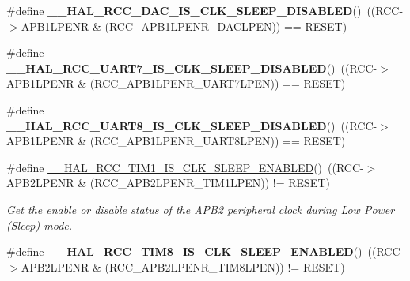 \begin{DoxyCompactItemize}
\item 
\mbox{\label{group___r_c_c___clock___sleep___enable___disable___status_ga12790e0adb572f2cd2c1b643906aa377}} 
\#define {\bfseries \+\_\+\+\_\+\+H\+A\+L\+\_\+\+R\+C\+C\+\_\+\+D\+A\+C\+\_\+\+I\+S\+\_\+\+C\+L\+K\+\_\+\+S\+L\+E\+E\+P\+\_\+\+D\+I\+S\+A\+B\+L\+ED}()~((R\+CC-\/$>$A\+P\+B1\+L\+P\+E\+NR \& (R\+C\+C\+\_\+\+A\+P\+B1\+L\+P\+E\+N\+R\+\_\+\+D\+A\+C\+L\+P\+EN)) == R\+E\+S\+ET)
\item 
\mbox{\label{group___r_c_c___clock___sleep___enable___disable___status_ga0b97aa0da40ed7519b3ddeb8267cccd8}} 
\#define {\bfseries \+\_\+\+\_\+\+H\+A\+L\+\_\+\+R\+C\+C\+\_\+\+U\+A\+R\+T7\+\_\+\+I\+S\+\_\+\+C\+L\+K\+\_\+\+S\+L\+E\+E\+P\+\_\+\+D\+I\+S\+A\+B\+L\+ED}()~((R\+CC-\/$>$A\+P\+B1\+L\+P\+E\+NR \& (R\+C\+C\+\_\+\+A\+P\+B1\+L\+P\+E\+N\+R\+\_\+\+U\+A\+R\+T7\+L\+P\+EN)) == R\+E\+S\+ET)
\item 
\mbox{\label{group___r_c_c___clock___sleep___enable___disable___status_gaf2de27f622cf9f740a925dcf1b533bdd}} 
\#define {\bfseries \+\_\+\+\_\+\+H\+A\+L\+\_\+\+R\+C\+C\+\_\+\+U\+A\+R\+T8\+\_\+\+I\+S\+\_\+\+C\+L\+K\+\_\+\+S\+L\+E\+E\+P\+\_\+\+D\+I\+S\+A\+B\+L\+ED}()~((R\+CC-\/$>$A\+P\+B1\+L\+P\+E\+NR \& (R\+C\+C\+\_\+\+A\+P\+B1\+L\+P\+E\+N\+R\+\_\+\+U\+A\+R\+T8\+L\+P\+EN)) == R\+E\+S\+ET)
\item 
\#define \mbox{\hyperlink{group___r_c_c___clock___sleep___enable___disable___status_ga0b265851c7557da6b372ff462819caa9}{\+\_\+\+\_\+\+H\+A\+L\+\_\+\+R\+C\+C\+\_\+\+T\+I\+M1\+\_\+\+I\+S\+\_\+\+C\+L\+K\+\_\+\+S\+L\+E\+E\+P\+\_\+\+E\+N\+A\+B\+L\+ED}}()~((R\+CC-\/$>$A\+P\+B2\+L\+P\+E\+NR \& (R\+C\+C\+\_\+\+A\+P\+B2\+L\+P\+E\+N\+R\+\_\+\+T\+I\+M1\+L\+P\+EN)) != R\+E\+S\+ET)
\begin{DoxyCompactList}\small\item\em Get the enable or disable status of the A\+P\+B2 peripheral clock during Low Power (Sleep) mode. \end{DoxyCompactList}\item 
\mbox{\label{group___r_c_c___clock___sleep___enable___disable___status_ga9a9f2ce9884285efd81f5fa66242cc9f}} 
\#define {\bfseries \+\_\+\+\_\+\+H\+A\+L\+\_\+\+R\+C\+C\+\_\+\+T\+I\+M8\+\_\+\+I\+S\+\_\+\+C\+L\+K\+\_\+\+S\+L\+E\+E\+P\+\_\+\+E\+N\+A\+B\+L\+ED}()~((R\+CC-\/$>$A\+P\+B2\+L\+P\+E\+NR \& (R\+C\+C\+\_\+\+A\+P\+B2\+L\+P\+E\+N\+R\+\_\+\+T\+I\+M8\+L\+P\+EN)) != R\+E\+S\+ET)

\end{DoxyCompactItemize}
